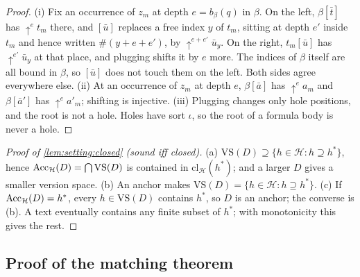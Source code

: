 \begin{proof}
(i) Fix an occurrence of $z_m$ at depth $e=b_\beta(q)$ in $\beta$. On the left, $\beta[\bar t]$ has $\uparrow^e t_m$ there, and $[\bar u]$ replaces a free index $y$ of $t_m$, sitting at depth $e'$ inside $t_m$ and hence written $\#(y+e+e')$, by $\uparrow^{e+e'}\bar u_y$. On the right, $t_m[\bar u]$ has $\uparrow^{e'}\bar u_y$ at that place, and plugging shifts it by $e$ more. The indices of $\beta$ itself are all bound in $\beta$, so $[\bar u]$ does not touch them on the left. Both sides agree everywhere else.
(ii) At an occurrence of $z_m$ at depth $e$, $\beta[\bar a]$ has $\uparrow^ea_m$ and $\beta[\bar a']$ has $\uparrow^ea'_m$; shifting is injective.
(iii) Plugging changes only hole positions, and the root is not a hole. Holes have sort $\iota$, so the root of a formula body is never a hole.
\end{proof}

\begin{proof}[Proof of \cref{lem:setting:closed} (sound iff closed)]
(a) $\mathrm{VS}(D)\supseteq\{h\in\mathcal H:h\supseteq h^*\}$, hence $\mathrm{Acc}_{\mathcal H}(D)=\bigcap\mathrm{VS}(D)$ is contained in $\mathrm{cl}_{\mathcal H}(h^*)$; and a larger $D$ gives a smaller version space. (b) An anchor makes $\mathrm{VS}(D)=\{h\in\mathcal H:h\supseteq h^*\}$. (c) If $\mathrm{Acc}_{\mathcal H}(D)=h^*$, every $h\in\mathrm{VS}(D)$ contains $h^*$, so $D$ is an anchor; the converse is (b). A text eventually contains any finite subset of $h^*$; with monotonicity this gives the rest.
\end{proof}

\subsection{Proof of the matching theorem}\label{app:setting:matching}

